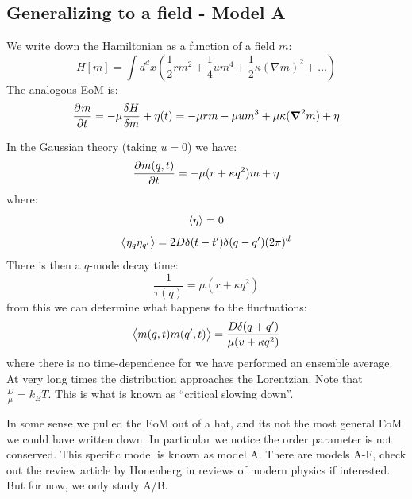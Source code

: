 \subsection{Generalizing to a field - Model A}
We write down the Hamiltonian as a function of a field $m$:
\begin{equation}
    H[m] = \int d^dx \left(\frac{1}{2}rm^2 + \frac{1}{4}um^4 + \frac{1}{2}\kappa (\nabla m)^2 + \ldots \right)
\end{equation}
The analogous EoM is:
\begin{equation}
    \dpd{m}{t} = -\mu\frac{\delta H}{\delta m} + \eta(t) = -\mu r m - \mu u m^3 + \mu \kappa(\nabla^2 m) + \eta
\end{equation}

In the Gaussian theory (taking $u = 0$) we have:
\begin{equation}
    \dpd{m(q, t)}{t} = -\mu(r + \kappa q^2)m + \eta
\end{equation}
where:
\begin{equation}
    \left< \eta \right> = 0
\end{equation}
\begin{equation}
    \left< \eta_q\eta_{q'} \right> = 2D\delta(t-t')\delta(q-q')(2\pi)^d
\end{equation}
There is then a $q$-mode decay time:
\begin{equation}
    \frac{1}{\tau(q)} = \mu(r + \kappa q^2)
\end{equation}
from this we can determine what happens to the fluctuations:
\begin{equation}
    \left< m(q, t)m(q', t) \right> = \frac{D\delta(q + q')}{\mu(v + \kappa q^2)}
\end{equation}
where there is no time-dependence for we have performed an ensemble average. At very long times the distribution approaches the Lorentzian. Note that $\frac{D}{\mu} = k_B T$. This is what is known as ``critical slowing down''.

In some sense we pulled the EoM out of a hat, and its not the most general EoM we could have written down. In particular we notice the order parameter is not conserved. This specific model is known as model A. There are models A-F, check out the review article by Honenberg in reviews of modern physics if interested. But for now, we only study A/B.

